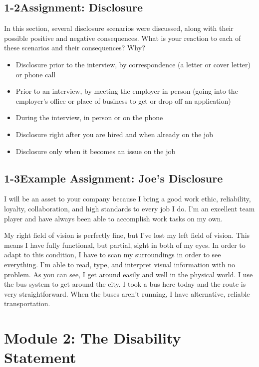 \pagebreak \subsection*{1-2\quad Assignment: Disclosure}
In this section, several disclosure scenarios were discussed, along with their possible positive and negative consequences. What is your reaction to each of these scenarios and their consequences? Why?
\begin{itemize}[leftmargin=*]
\item Disclosure prior to the interview, by correspondence (a letter or cover letter) or phone call
\item Prior to an interview, by meeting the employer in person (going into the employer's office or place of business to get or drop off an application)
\item During the interview, in person or on the phone
\item Disclosure right after you are hired and when already on the job
\item Disclosure only when it becomes an issue on the job
\end{itemize}
\pagebreak \subsection*{1-3\quad Example Assignment: Joe's Disclosure}
I will be an asset to your company because I bring a good work ethic, reliability, loyalty, collaboration, and high standards to every job I do. I'm an excellent team player and have always been able to accomplish work tasks on my own.

My right field of vision is perfectly fine, but I've lost my left field of vision. This means I have fully functional, but partial, sight in both of my eyes. In order to adapt to this condition, I have to scan my surroundings in order to see everything. I'm able to read, type, and interpret visual information with no problem. As you can see, I get around easily and well in the physical world. I use the bus system to get around the city. I took a bus here today and the route is very straightforward. When the buses aren't running, I have alternative, reliable transportation.
 
\pagebreak \section*{Module 2: The Disability Statement}
\noindent\makebox[\textwidth]{\rule{\linewidth}{0.4pt}}  \localtableofcontents 
\noindent\makebox[\textwidth]{\rule{\linewidth}{0.4pt}} 



